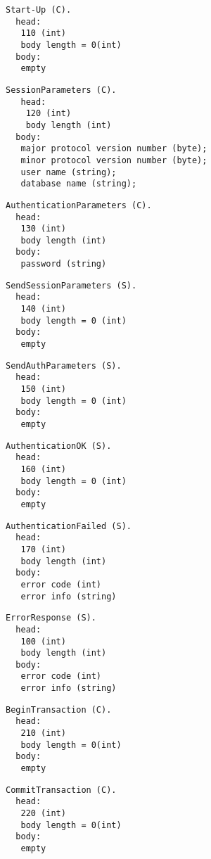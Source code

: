 \documentclass[a4paper,12pt]{article}
\begin{document}
\begin{verbatim}
Start-Up (C).
  head:
   110 (int)
   body length = 0(int)
  body:
   empty
\end{verbatim}   

\begin{verbatim}
SessionParameters (C).
   head:
    120 (int)
    body length (int)
  body:
   major protocol version number (byte);
   minor protocol version number (byte);
   user name (string);
   database name (string);
\end{verbatim}   

\begin{verbatim}
AuthenticationParameters (C).
  head:
   130 (int)
   body length (int)
  body:
   password (string)
\end{verbatim}   

\begin{verbatim}
SendSessionParameters (S).
  head:
   140 (int)
   body length = 0 (int)
  body:
   empty 
\end{verbatim}
   
\begin{verbatim}
SendAuthParameters (S).
  head:
   150 (int)
   body length = 0 (int)
  body:
   empty
\end{verbatim}   
  
\begin{verbatim}  
AuthenticationOK (S).
  head:
   160 (int)
   body length = 0 (int)
  body:
   empty
\end{verbatim}   

\begin{verbatim}
AuthenticationFailed (S).
  head:
   170 (int)
   body length (int)
  body:
   error code (int)
   error info (string)
\end{verbatim}

\begin{verbatim}
ErrorResponse (S).
  head:
   100 (int)
   body length (int)
  body:
   error code (int)
   error info (string)
\end{verbatim}   

\begin{verbatim}
BeginTransaction (C).
  head:
   210 (int)
   body length = 0(int)
  body:
   empty
\end{verbatim}   

\begin{verbatim}
CommitTransaction (C).
  head:
   220 (int)
   body length = 0(int)
  body:
   empty
\end{verbatim}   
\end{document}
